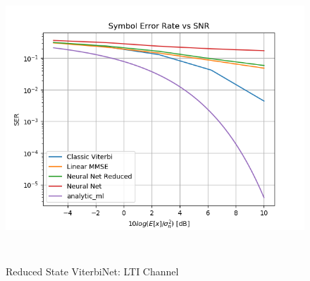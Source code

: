 \documentclass[12pt,a4paper]{article}
\begin{document}
\begin{figure}[H]
	  \caption{Reduced State ViterbiNet: LTI Channel}
	\includegraphics[width=\textwidth,height = 10cm]{results/lti_reduced}
	  \label{fig:reduced_lti}
\end{figure}
\end{document}
